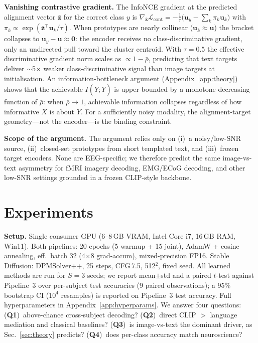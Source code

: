 \documentclass{article}
\begin{document}
\textbf{Vanishing contrastive gradient.} The InfoNCE gradient at the predicted alignment vector $\bar{\mathbf{z}}$ for the correct class $y$ is
$\nabla_{\bar{\mathbf{z}}}\mathcal{L}_\mathrm{cont}=-\tfrac{1}{\tau}\big(\mathbf{u}_y-\sum_k\pi_k\mathbf{u}_k\big)$ with $\pi_k\propto\exp(\bar{\mathbf{z}}^\top\mathbf{u}_k/\tau)$.
When prototypes are nearly collinear ($\mathbf{u}_k\!\approx\!\mathbf{u}$) the bracket collapses to $\mathbf{u}_y-\mathbf{u}\!\approx\!\mathbf{0}$: the encoder receives no class-discriminative gradient, only an undirected pull toward the cluster centroid. With $\tau{=}0.5$ the effective discriminative gradient norm scales as $\propto 1-\bar{\rho}$, predicting that text targets deliver $\sim$5$\times$ weaker class-discriminative signal than image targets at initialisation. An information-bottleneck argument (Appendix~\ref{app:theory}) shows that the achievable $I(\hat Y;Y)$ is upper-bounded by a monotone-decreasing function of $\bar{\rho}$: when $\bar{\rho}\to 1$, achievable information collapses regardless of how informative $X$ is about $Y$. For a sufficiently noisy modality, the alignment-target geometry---not the encoder---is the binding constraint.

\textbf{Scope of the argument.} The argument relies only on (i)~a noisy/low-SNR source, (ii)~closed-set prototypes from short templated text, and (iii)~frozen target encoders. None are EEG-specific; we therefore predict the same image-vs-text asymmetry for fMRI imagery decoding, EMG/ECoG decoding, and other low-SNR settings grounded in a frozen CLIP-style backbone.

\section{Experiments}
\label{sec:experiments}

\textbf{Setup.} Single consumer GPU (6--8\,GB VRAM, Intel Core i7, 16\,GB RAM, Win11). Both pipelines: 20 epochs (5 warmup + 15 joint), AdamW + cosine annealing, eff.\ batch 32 (4$\times$8 grad-accum), mixed-precision FP16. Stable Diffusion: DPMSolver++, 25 steps, CFG\,7.5, 512$^2$, fixed seed. All learned methods are run for $S{=}3$ seeds; we report mean$\pm$std and a paired $t$-test against Pipeline~3 over per-subject test accuracies (9 paired observations); a 95\% bootstrap CI ($10^4$ resamples) is reported on Pipeline~3 test accuracy. Full hyperparameters in Appendix~\ref{app:hyperparams}. We answer four questions: (\textbf{Q1})~above-chance cross-subject decoding? (\textbf{Q2})~direct CLIP $>$ language mediation and classical baselines? (\textbf{Q3})~is image-vs-text the dominant driver, as Sec.~\ref{sec:theory} predicts? (\textbf{Q4})~does per-class accuracy match neuroscience?
\end{document}
